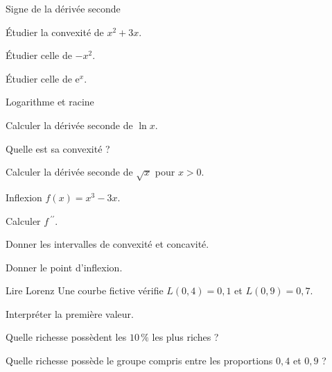 \exercices
{}
\begingroup\renewcommand{\otBesoinPlace}[1]{}\begin{minipage}{\linewidth}
\begin{exercice}[1]{Signe de la dérivée seconde}

\begin{questions}
\item Étudier la convexité de $x^2+3x$.
\item Étudier celle de $-x^2$.
\item Étudier celle de $\mathrm e^x$.
\end{questions}
\end{exercice}
\begin{exercice}[1]{Logarithme et racine}

\begin{questions}
\item Calculer la dérivée seconde de $\ln x$.
\item Quelle est sa convexité ?
\item Calculer la dérivée seconde de $\sqrt x$ pour $x>0$.
\end{questions}
\end{exercice}
\begin{exercice}[1]{Inflexion}
$f(x)=x^3-3x$.
\begin{questions}
\item Calculer $f\,\!^{\prime\prime}$.
\item Donner les intervalles de convexité et concavité.
\item Donner le point d’inflexion.
\end{questions}
\end{exercice}
\begin{exercice}[1]{Lire Lorenz}
Une courbe fictive vérifie $L(0{,}4)=0{,}1$ et $L(0{,}9)=0{,}7$.
\begin{questions}
\item Interpréter la première valeur.
\item Quelle richesse possèdent les $10\,\%$ les plus riches ?
\item Quelle richesse possède le groupe compris entre les proportions $0{,}4$ et $0{,}9$ ?
\end{questions}
\end{exercice}
\end{minipage}\endgroup
\clearpage
{}

